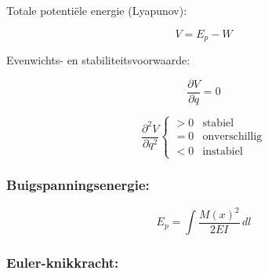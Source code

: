 \documentclass[a4paper,11pt]{article}
\begin{document}
\noindent
\begin{minipage}[t]{0.42\textwidth}
\noindent Totale potentiële energie (Lyapunov):

\vspace{0.8em}

\begin{equation}
V = E_p - W
\end{equation}

\end{minipage}
\hfill
\begin{minipage}[t]{0.45\textwidth}
\noindent Evenwichts- en stabiliteitsvoorwaarde:

\vspace{0.8em}

\begin{equation}
\frac{\partial V}{\partial q} = 0
\end{equation}

\begin{equation}
\frac{\partial^2 V}{\partial q^2}
\begin{cases}
>0 & \text{stabiel} \\
=0 & \text{onverschillig} \\
<0 & \text{instabiel}
\end{cases}
\end{equation}
\end{minipage}

\vspace{.6cm}

\subsubsection*{Buigspanningsenergie:}
\vspace{.2cm}

\begin{equation}
E_p = \int \frac{M(x)^2}{2EI}\, dl
\end{equation}

\vspace{.6cm}

\subsubsection*{Euler-knikkracht:}
\vspace{.2cm}
\end{document}
